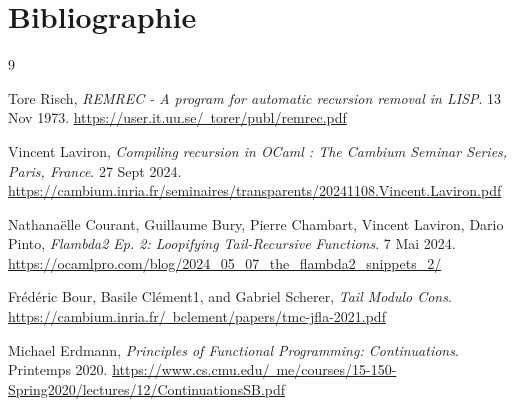 \section{Bibliographie}

\begin{thebibliography}{9}

    Tore Risch,
    \textit{REMREC - A program for automatic recursion removal in LISP}.
    13 Nov 1973.
    \href{https://user.it.uu.se/~torer/publ/remrec.pdf}{https://user.it.uu.se/~torer/publ/remrec.pdf}

    Vincent Laviron,
    \textit{Compiling recursion in OCaml : The Cambium Seminar Series, Paris, France}.
    27 Sept 2024.
    \href{https://cambium.inria.fr/seminaires/transparents/20241108.Vincent.Laviron.pdf}{https://cambium.inria.fr/seminaires/transparents/20241108.Vincent.Laviron.pdf}

    Nathanaëlle Courant, Guillaume Bury, Pierre Chambart, Vincent Laviron, Dario Pinto,
    \textit{Flambda2 Ep. 2: Loopifying Tail-Recursive Functions}.
    7 Mai 2024.
    \href{https://ocamlpro.com/blog/2024_05_07_the_flambda2_snippets_2/}{https://ocamlpro.com/blog/2024\_05\_07\_the\_flambda2\_snippets\_2/}

    Frédéric Bour, Basile Clément1, and Gabriel Scherer,
    \textit{Tail Modulo Cons}.
    \href{https://cambium.inria.fr/~bclement/papers/tmc-jfla-2021.pdf}{https://cambium.inria.fr/~bclement/papers/tmc-jfla-2021.pdf}

    Michael Erdmann,
    \textit{Principles of Functional Programming: Continuations}.
    Printemps 2020.
    \href{https://www.cs.cmu.edu/~me/courses/15-150-Spring2020/lectures/12/ContinuationsSB.pdf}{https://www.cs.cmu.edu/~me/courses/15-150-Spring2020/lectures/12/ContinuationsSB.pdf}

\end{thebibliography}